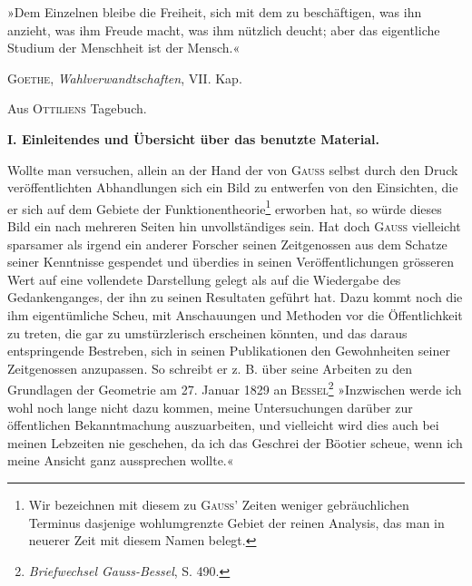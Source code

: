 \clearpage\NoSourceHead{}
\renewcommand{\thefootnote}{\arabic{footnote})}
\setcounter{footnote}{0}
\begin{flushright}
\begin{minipage}{.70\textwidth}\small
»Dem Einzelnen bleibe die Freiheit, sich mit dem zu
beschäftigen, was ihn anzieht, was ihm Freude macht, was
ihm nützlich deucht; aber das eigentliche Studium der
Menschheit ist der Mensch.«\par
\begin{flushright}
\textsc{Goethe}, \textit{Wahlverwandtschaften}, VII. Kap.\par
Aus \textsc{Ottiliens} Tagebuch.
\end{flushright}
\end{minipage}
\end{flushright}
\bigskip
\begin{center}\bfseries I. Einleitendes und Übersicht über das benutzte Material.\end{center}
\indent Wollte man versuchen, allein an der Hand der von \textsc{Gauss} selbst durch
den Druck veröffentlichten Abhandlungen sich ein Bild zu entwerfen von den
Einsichten, die er sich auf dem Gebiete der Funktionentheorie\footnote{Wir bezeichnen mit diesem zu \textsc{Gauss}’ Zeiten weniger gebräuchlichen Terminus dasjenige wohlumgrenzte Gebiet der reinen Analysis, das man in neuerer Zeit mit diesem Namen belegt.} erworben
hat, so würde dieses Bild ein nach mehreren Seiten hin unvollständiges sein.
Hat doch \textsc{Gauss} vielleicht sparsamer als irgend ein anderer Forscher seinen
Zeitgenossen aus dem Schatze seiner Kenntnisse gespendet und überdies in
seinen Veröffentlichungen grösseren Wert auf eine vollendete Darstellung gelegt
als auf die Wiedergabe des Gedankenganges, der ihn zu seinen Resultaten
geführt hat. Dazu kommt noch die ihm eigentümliche Scheu, mit
Anschauungen und Methoden vor die Öffentlichkeit zu treten, die gar zu
umstürzlerisch erscheinen könnten, und das daraus entspringende Bestreben,
sich in seinen Publikationen den Gewohnheiten seiner Zeitgenossen anzupassen.
So schreibt er z. B. über seine Arbeiten zu den Grundlagen der Geometrie
am 27. Januar 1829 an \textsc{Bessel}\footnote{\textit{Briefwechsel Gauss-Bessel}, S. 490.} »Inzwischen werde ich wohl noch lange nicht
dazu kommen, meine  Untersuchungen darüber zur öffentlichen
Bekanntmachung auszuarbeiten, und vielleicht wird dies auch bei meinen
Lebzeiten nie geschehen, da ich das Geschrei der Böotier scheue, wenn ich
meine Ansicht ganz aussprechen wollte.«
\HistoricalFoot{}{1\textsuperscript{*}}

